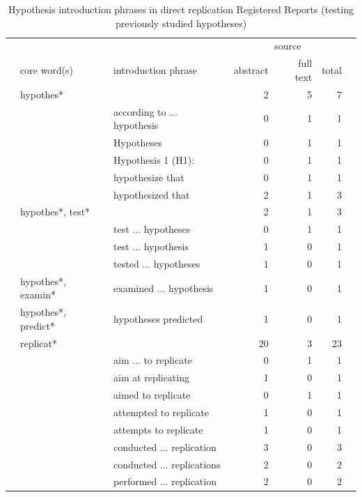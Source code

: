 \documentclass[british,,jou,floatsintext]{apa6}
\begin{document}
\begin{table}[tbp]

\begin{center}
\begin{threeparttable}

\caption{\label{tab:unnamed-chunk-7}Hypothesis introduction phrases in direct replication Registered Reports (testing previously studied hypotheses)}

\footnotesize{

\begin{tabular}{lllrrrr}
\toprule
 &  &  & \multicolumn{3}{c}{source}  &\\
\cmidrule(r){4-6}
 & core word(s) & introduction phrase & abstract & full text & total & \\
\midrule
 & hypothes* &  & 2 & 5 & 7 & \\
 &  & according to ... hypothesis & 0 & 1 & 1 & \\
 &  & Hypotheses & 0 & 1 & 1 & \\
 &  & Hypothesis 1 (H1): & 0 & 1 & 1 & \\
 &  & hypothesize that & 0 & 1 & 1 & \\
 &  & hypothesized that & 2 & 1 & 3 & \\ \midrule
 & hypothes*, test* &  & 2 & 1 & 3 & \\
 &  & test ... hypotheses & 0 & 1 & 1 & \\
 &  & test ... hypothesis & 1 & 0 & 1 & \\
 &  & tested ... hypotheses & 1 & 0 & 1 & \\ \midrule
 & hypothes*, examin* & examined ... hypothesis & 1 & 0 & 1 & \\ \midrule
 & hypothes*, predict* & hypotheses predicted & 1 & 0 & 1 & \\ \midrule
 & replicat* &  & 20 & 3 & 23 & \\
 &  & aim ... to replicate & 0 & 1 & 1 & \\
 &  & aim at replicating & 1 & 0 & 1 & \\
 &  & aimed to replicate & 0 & 1 & 1 & \\
 &  & attempted to replicate & 1 & 0 & 1 & \\
 &  & attempts to replicate & 1 & 0 & 1 & \\
 &  & conducted ... replication & 3 & 0 & 3 & \\
 &  & conducted ... replications & 2 & 0 & 2 & \\
 &  & performed ... replication & 2 & 0 & 2 & \\

\end{tabular}}
\end{threeparttable}
\end{center}
\end{table}
\end{document}
